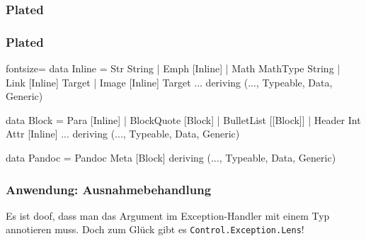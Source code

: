 \documentclass{beamer}
\newcommand{\ev}{$\rightsquigarrow$} %
\begin{document}
\begin{frame}[fragile]
  \frametitle{Plated}
\end{frame}

\begin{frame}[fragile]
  \frametitle{Plated}
  \begin{haskellcode*}{fontsize=\small}
data Inline
  = Str String
  | Emph [Inline]
  | Math MathType String
  | Link [Inline] Target
  | Image [Inline] Target
    ...
  deriving (..., Typeable, Data, Generic)

data Block
  = Para [Inline]
  | BlockQuote [Block]
  | BulletList [[Block]]
  | Header Int Attr [Inline]
    ...
  deriving (..., Typeable, Data, Generic)

data Pandoc = Pandoc Meta [Block]
  deriving (..., Typeable, Data, Generic)
  \end{haskellcode*}
\end{frame}

\begin{frame}[fragile,t]
  \frametitle{Anwendung: Ausnahmebehandlung}
  Es ist doof, dass man das Argument im Exception-Handler mit einem Typ annotieren muss.
  Doch zum Glück gibt es \verb|Control.Exception.Lens|!
\end{frame}
\end{document}
